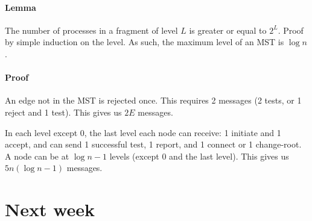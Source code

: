 \documentclass{idc_msc}
\begin{document}
\paragraph{Lemma}
The number of processes in a fragment of level $L$ is greater or equal to $2^L$. Proof by simple induction on the level.
As such, the maximum level of an MST is $\log n$.

\paragraph{Proof}
An edge not in the MST is rejected once. This requires 2 messages (2 tests, or 1 reject and 1 test). This gives us $2E$ messages.

In each level except 0, the last level each node can receive: 1 initiate and 1 accept, and can send 1 successful test, 1 report, and 1 connect or 1 change-root.
A node can be at $\log n-1$ levels (except 0 and the last level).
This gives us $5n (\log n -1)$ messages.

\section{Next week}
\end{document}
